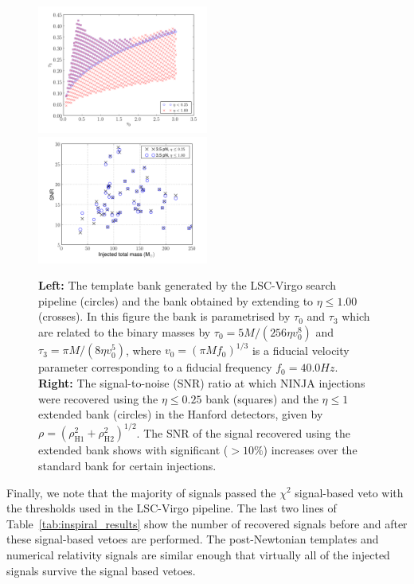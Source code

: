 \begin{figure}
  \includegraphics[width=0.50\textwidth]{figures/ninja1/BankBoth}
  \includegraphics[width=0.50\textwidth]{figures/ninja1/HanfordSNR}
  \caption[NINJA-1 results from the extended template bank]{
  {\bf Left:} The template bank generated by the LSC-Virgo
  search pipeline (circles) and the bank obtained by extending to
  $\eta \leq 1.00$ (crosses). In this figure the bank is parametrised
  by $\tau_0$ and $\tau_3$ which are related to the binary masses by
  $\tau_0 = 5M/(256\eta v_0^8)$ and $\tau_3 = \pi M/(8\eta v_0^5)$,
  where $v_0 = (\pi M f_0)^{1/3}$ is a fiducial velocity parameter
  corresponding to a fiducial frequency $f_0 = 40.0 Hz$.
  {\bf Right:} The
  signal-to-noise (SNR) ratio at which NINJA injections were recovered using
  the $\eta \le 0.25$ bank (squares) and the $\eta \le 1$ extended bank
  (circles) in the Hanford detectors, given by $\rho =
  (\rho_\mathrm{H1}^2 + \rho_\mathrm{H2}^2)^{1/2}$. The SNR of the signal
  recovered using the extended bank shows with significant ($> 10\%$) 
  increases over the standard bank for certain injections.}
  \label{f:templateBanks}
\end{figure}

Finally, we note that the majority of signals passed the $\chi^2$
signal-based veto with the thresholds used in the LSC-Virgo pipeline.  The
last two lines of Table~\ref{tab:inspiral_results} show the number of
recovered signals before and after these signal-based vetoes are
performed. The post-Newtonian templates and numerical relativity signals are
similar enough that virtually all of the injected signals survive the signal
based vetoes. 

